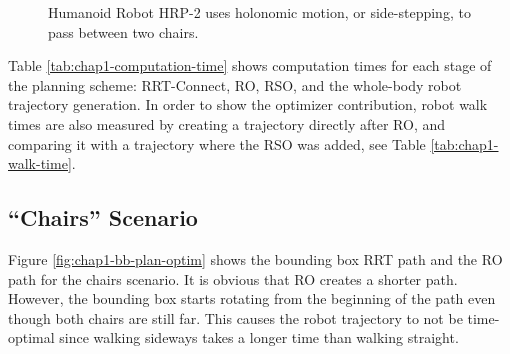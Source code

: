 \begin{figure}
  \caption{Humanoid Robot HRP-2 uses holonomic motion, or
    side-stepping, to pass between two chairs.}
  \label{fig:chap1-hrp2-chairs}
\end{figure}

Table \ref{tab:chap1-computation-time} shows computation times for
each stage of the planning scheme: RRT-Connect, RO, RSO, and the
whole-body robot trajectory generation. In order to show the optimizer
contribution, robot walk times are also measured by creating a
trajectory directly after RO, and comparing it with a trajectory where
the RSO was added, see Table \ref{tab:chap1-walk-time}.

\subsection{``Chairs'' Scenario}
\label{subsec:chap1-chairs}

Figure \ref{fig:chap1-bb-plan-optim} shows the bounding box RRT path
and the RO path for the chairs scenario. It is obvious that RO creates
a shorter path. However, the bounding box starts rotating from the
beginning of the path even though both chairs are still far. This
causes the robot trajectory to not be time-optimal since walking
sideways takes a longer time than walking straight.

